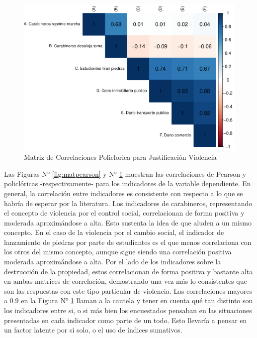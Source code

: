 \documentclass[12pt,twoside]{templates/facsothesis}
\begin{document}
\begin{figure}[!ht]

{\centering \includegraphics[width=1\linewidth,]{tesis_files/figure-latex/matpolycor-1} 

}

\caption{Matriz de Correlaciones Policlorica para Justificación Violencia}\label{fig:matpolycor}
\end{figure}

Las Figuras N° \ref{fig:matpearson} y N° \ref{fig:matpolycor} muestran las correlaciones de Pearson y policlóricas -respectivamente- para los indicadores de la variable dependiente. En general, la correlación entre indicadores es consistente con respecto a lo que se habría de esperar por la literatura. Los indicadores de carabineros, representando el concepto de violencia por el control social, correlacionan de forma positiva y moderada aproximándose a alta. Esto sustenta la idea de que aluden a un mismo concepto. En el caso de la violencia por el cambio social, el indicador de lanzamiento de piedras por parte de estudiantes es el que menos correlaciona con los otros del mismo concepto, aunque sigue siendo una correlación positiva moderada aproximándose a alta. Por el lado de los indicadores sobre la destrucción de la propiedad, estos correlacionan de forma positiva y bastante alta en ambas matrices de correlación, demostrando una vez más lo consistentes que son las respuestas con este tipo particular de violencia. Las correlaciones mayores a 0.9 en la Figura N° \ref{fig:matpolycor} llaman a la cautela y tener en cuenta qué tan distinto son los indicadores entre si, o si más bien los encuestados pensaban en las situaciones presentadas en cada indicador como parte de un todo. Esto llevaría a pensar en un factor latente por sí solo, o el uso de índices sumativos.
\end{document}

